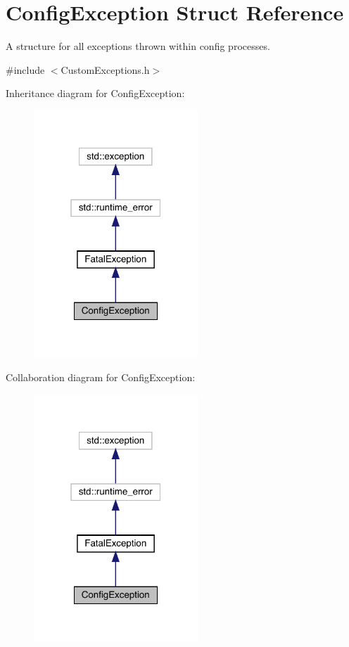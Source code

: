 \hypertarget{struct_config_exception}{}\section{Config\+Exception Struct Reference}
\label{struct_config_exception}


A structure for all exceptions thrown within config processes.  




{\ttfamily \#include $<$Custom\+Exceptions.\+h$>$}



Inheritance diagram for Config\+Exception\+:
\nopagebreak
\begin{figure}[H]
\begin{center}
\leavevmode
\includegraphics[width=175pt]{struct_config_exception__inherit__graph}
\end{center}
\end{figure}


Collaboration diagram for Config\+Exception\+:
\nopagebreak
\begin{figure}[H]
\begin{center}
\leavevmode
\includegraphics[width=175pt]{struct_config_exception__coll__graph}
\end{center}
\end{figure}
